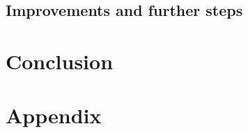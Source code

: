 \documentclass[bibliography=totocnumbered]{article}
\theoremstyle{NoticeStyle}
\begin{document}
\subsection{Improvements and further steps}

%
\section{Conclusion}


%
\section{Appendix}
%

\newpage

{}

\nocite{Perry2012}
\nocite{BasicConceptsQC}



\end{document}
